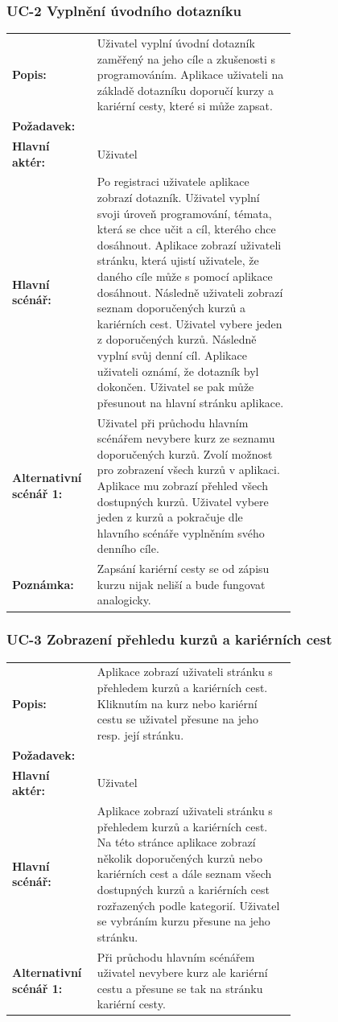 \subsubsection{UC-2 Vyplnění úvodního dotazníku}

\begin{tabular}{lp{0.7\linewidth}}
  \textbf{Popis:} & Uživatel vyplní úvodní dotazník zaměřený na jeho cíle a zkušenosti s programováním. Aplikace uživateli na základě dotazníku doporučí kurzy a kariérní cesty, které si může zapsat. \\
  \textbf{Požadavek:} & \nameref{sec:fp-onboarding} \\
  \textbf{Hlavní aktér:} & Uživatel \\
  \textbf{Hlavní scénář:} & Po registraci uživatele aplikace zobrazí dotazník. Uživatel vyplní svoji úroveň programování, témata, která se chce učit a cíl, kterého chce dosáhnout. Aplikace zobrazí uživateli stránku, která ujistí uživatele, že daného cíle může s pomocí aplikace dosáhnout. Následně uživateli zobrazí seznam doporučených kurzů a kariérních cest. Uživatel vybere jeden z doporučených kurzů. Následně vyplní svůj denní cíl. Aplikace uživateli oznámí, že dotazník byl dokončen. Uživatel se pak může přesunout na hlavní stránku aplikace. \\
  \textbf{Alternativní scénář 1:} & Uživatel při průchodu hlavním scénářem nevybere kurz ze seznamu doporučených kurzů. Zvolí možnost pro zobrazení všech kurzů v aplikaci. Aplikace mu zobrazí přehled všech dostupných kurzů. Uživatel vybere jeden z kurzů a pokračuje dle hlavního scénáře vyplněním svého denního cíle. \\
  \textbf{Poznámka:} & Zapsání kariérní cesty se od zápisu kurzu nijak neliší a bude fungovat analogicky. \\
\end{tabular}

\subsubsection{UC-3 Zobrazení přehledu kurzů a kariérních cest}

\begin{tabular}{lp{0.7\linewidth}}
  \textbf{Popis:} & Aplikace zobrazí uživateli stránku s přehledem kurzů a kariérních cest. Kliknutím na kurz nebo kariérní cestu se uživatel přesune na jeho resp. její stránku. \\
  \textbf{Požadavek:} & \nameref{sec:fp-course-browse} \\
  \textbf{Hlavní aktér:} & Uživatel \\
  \textbf{Hlavní scénář:} & Aplikace zobrazí uživateli stránku s přehledem kurzů a kariérních cest. Na této stránce aplikace zobrazí několik doporučených kurzů nebo kariérních cest a dále seznam všech dostupných kurzů a kariérních cest rozřazených podle kategorií. Uživatel se vybráním kurzu přesune na jeho stránku. \\
  \textbf{Alternativní scénář 1:} & Při průchodu hlavním scénářem uživatel nevybere kurz ale kariérní cestu a přesune se tak na stránku kariérní cesty. \\
\end{tabular}

